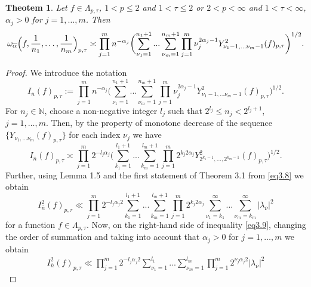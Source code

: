 \documentclass[12pt]{article}
\theoremstyle{plain}
\newtheorem{theorem}{Theotem}[section]
\begin{document}
\begin{theorem}\label{th3.3} 
Let  $f \in \Lambda_{p, \tau}$, $1<p\leqslant 2$ and $1<\tau \leqslant 2$ or $2< p<\infty$ and $1<\tau <\infty$, $\alpha_{j}> 0$ for $j=1,\ldots,m$. Then
 \begin{equation*}  
\omega_{\overline\alpha}\Bigl(f,\frac{1}{n_{1}},\ldots, \frac{1}{n_{m}}\Bigr)_{p, \tau}  \asymp
\prod_{j=1}^{m}n^{-\alpha_{j}}\biggl(\sum\limits_{\nu_{1}=1}^{n_{1}+1}...\sum\limits_{\nu_{m}=1}^{n_{m}+1}\prod_{j=1}^{m}\nu_{j}^{2\alpha_{j}-1} Y_{\nu_{1}-1,... \nu_{m}-1}^{2}(f)_{p, \tau} \biggr)^{1/2}.
\end{equation*}
 \end{theorem}
\begin{proof}
We introduce the notation  
 \begin{equation*}
 I_{\overline{n}}(f)_{p, \tau}:=\prod_{j=1}^{m}n^{-\alpha_{j}}\biggl(\sum\limits_{\nu_{1}=1}^{n_{1}+1}...\sum\limits_{\nu_{m}=1}^{n_{m}+1}\prod_{j=1}^{m}\nu_{j}^{2\alpha_{j}-1} Y_{\nu_{1}-1,... \nu_{m}-1}^{2}(f)_{p, \tau} \biggr)^{1/2}.
 \end{equation*}
For $n_{j}\in \mathbb{N}$, choose a non-negative integer $l_{j}$ such that $2^{l_{j}}\leqslant n_{j}< 2^{l_{j}+1}$, $j=1,\ldots,m$. Then, by the property of monotone decrease of the sequence $\{Y_{\nu_{1},... \nu_{m}}(f)_{p, \tau}\}$ for each index $\nu_{j}$ we have
  \begin{equation}\label{eq3.8}
 I_{\overline{n}}(f)_{p, \tau} \asymp \prod_{j=1}^{m}2^{-l_{j}\alpha_{j}}\biggl(\sum\limits_{k_{1}=1}^{l_{1}+1}...\sum\limits_{k_{m}=1}^{l_{m}+1}\prod_{j=1}^{m}2^{k_{j}2\alpha_{j}}Y_{2^{k_{1}-1},... ,2^{k_{m}-1}}^{2}(f)_{p, \tau} \biggr)^{1/2}.
\end{equation} 
Further, using Lemma 1.5 and the first statement of Theorem 3.1 from \eqref{eq3.8} we obtain 
   \begin{equation}\label{eq3.9}
 I_{\overline{n}}^{2}(f)_{p, \tau} \ll \prod_{j=1}^{m}2^{-l_{j}\alpha_{j}2}\sum\limits_{k_{1}=1}^{l_{1}+1}...\sum\limits_{k_{m}=1}^{l_{m}+1}\prod_{j=1}^{m}2^{k_{j}2\alpha_{j}}\sum\limits_{\nu_{1}=k_{1}}^{\infty}...\sum\limits_{\nu_{m}=k_{m}}^{\infty}|\lambda_{\overline{\nu}}|^{2} 
\end{equation} 
for a function 
 $f \in \Lambda_{p ,\tau}$.
Now, on the right-hand side of inequality \eqref{eq3.9}, changing the order of summation and taking into account that $\alpha_{j}>0$ for $j=1,\ldots,m$ we obtain
    \begin{multline}\label{eq3.10}
 I_{\overline{n}}^{2}(f)_{p, \tau} \ll \prod_{j=1}^{m}2^{-l_{j}\alpha_{j}2}\sum\limits_{\nu_{1}=1}^{l_{1}}...\sum\limits_{\nu_{m}=1}^{l_{m}}\prod_{j=1}^{m}2^{\nu_{j}\alpha_{j}2}|\lambda_{\overline{\nu}}|^{2}

\end{multline}
\end{proof}
\end{document}
